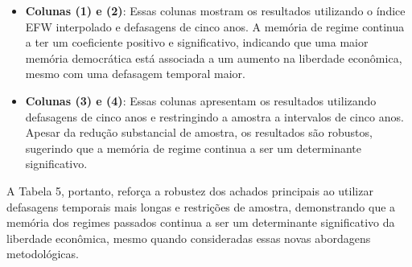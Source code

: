 		\begin{itemize}
			\item \textbf{Colunas (1) e (2)}: Essas colunas mostram os resultados utilizando o índice EFW interpolado e defasagens de cinco anos. A memória de regime continua a ter um coeficiente positivo e significativo, indicando que uma maior memória democrática está associada a um aumento na liberdade econômica, mesmo com uma defasagem temporal maior.
			\item \textbf{Colunas (3) e (4)}: Essas colunas apresentam os resultados utilizando defasagens de cinco anos e restringindo a amostra a intervalos de cinco anos. Apesar da redução substancial de amostra, os resultados são robustos, sugerindo que a memória de regime continua a ser um determinante significativo.
		\end{itemize}
		
		A Tabela 5, portanto, reforça a robustez dos achados principais ao utilizar defasagens temporais mais longas e restrições de amostra, demonstrando que a memória dos regimes passados continua a ser um determinante significativo da liberdade econômica, mesmo quando consideradas essas novas abordagens metodológicas.
		

\begin{table}
	\caption{Tabela 5 do Artigo Original - Defasagens de cinco anos.}
	\label{tab:tabela5}
	\small
	\end{table}

